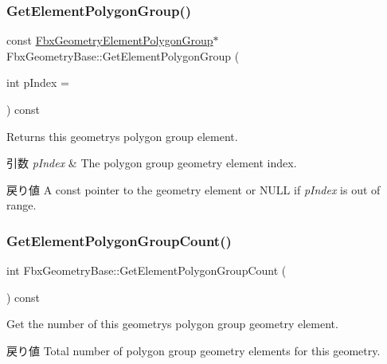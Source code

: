 \subsubsection{\texorpdfstring{Get\+Element\+Polygon\+Group()}{GetElementPolygonGroup()}\hspace{0.1cm}{\footnotesize\ttfamily [2/2]}}
{\footnotesize\ttfamily const \hyperlink{fbxlayer_8h_aa5c7fb92a1c396014bf2ced7797a95a9}{Fbx\+Geometry\+Element\+Polygon\+Group}$\ast$ Fbx\+Geometry\+Base\+::\+Get\+Element\+Polygon\+Group (\begin{DoxyParamCaption}\item[{int}]{p\+Index = {} }\end{DoxyParamCaption}) const}

Returns this geometry\textquotesingle{}s polygon group element. 
\begin{DoxyParams}{引数}
{\em p\+Index} & The polygon group geometry element index. \\
\hline
\end{DoxyParams}
\begin{DoxyReturn}{戻り値}
A const pointer to the geometry element or {\ttfamily N\+U\+LL} if {\itshape p\+Index} is out of range. 
\end{DoxyReturn}
\mbox{\label{class_fbx_geometry_base_a138cf34dd7162a7984a3317d0d4ff03b}} 
\subsubsection{\texorpdfstring{Get\+Element\+Polygon\+Group\+Count()}{GetElementPolygonGroupCount()}}
{\footnotesize\ttfamily int Fbx\+Geometry\+Base\+::\+Get\+Element\+Polygon\+Group\+Count (\begin{DoxyParamCaption}{ }\end{DoxyParamCaption}) const}

Get the number of this geometry\textquotesingle{}s polygon group geometry element. \begin{DoxyReturn}{戻り値}
Total number of polygon group geometry elements for this geometry. 
\end{DoxyReturn}
\mbox{\label{class_fbx_geometry_base_a6ba008301dd152eef938f18fc87ff385}} 
